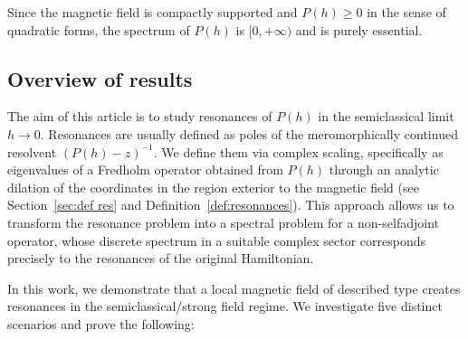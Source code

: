 \documentclass[11pt]{amsart}
\theoremstyle{remark}
\numberwithin{equation}{section}
\begin{document}
Since the magnetic field is compactly supported and $P(h)\geq 0$ in the sense of quadratic forms, the spectrum of $P(h)$ is $[0,+\infty)$ and is purely essential. 

\subsection{Overview of results}

The aim of this article is to study resonances of $P(h)$ in the semiclassical limit $h \to 0$. Resonances are usually defined as poles of the meromorphically continued resolvent $(P(h)-z)^{-1}$. We define them via complex scaling, specifically as eigenvalues of a Fredholm operator obtained from $P(h)$ through an analytic dilation of the coordinates in the region exterior to the magnetic field (see Section~\ref{sec:def res} and Definition~\ref{def:resonances}). This approach allows us to transform the resonance problem into a spectral problem for a non-selfadjoint operator, whose discrete spectrum in a suitable complex sector corresponds precisely to the resonances of the original Hamiltonian.\medskip


In this work, we demonstrate that a local magnetic field of described type creates resonances in the semiclassical/strong field regime. We investigate five distinct scenarios and prove the following:

%
\end{document}
